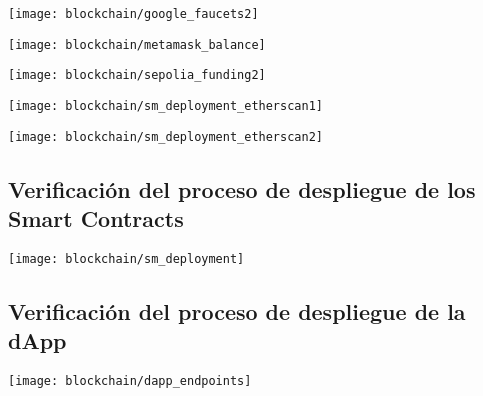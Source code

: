 \begin{center}
   \texttt{[image: blockchain/google\_faucets2]}
   \label{fig:google_faucets2}
\end{center}

\begin{center}
   \texttt{[image: blockchain/metamask\_balance]}
   \label{fig:metamask_balance}
\end{center}


\begin{center}
   \texttt{[image: blockchain/sepolia\_funding2]}
   \label{fig:sepolia_funding2}
\end{center}



\begin{center}
   \texttt{[image: blockchain/sm\_deployment\_etherscan1]}
   \label{fig:sm_deployment_etherscan1}
\end{center}

\begin{center}
   \texttt{[image: blockchain/sm\_deployment\_etherscan2]}
   \label{fig:sm_deployment_etherscan2}
\end{center}



\subsection{Verificación del proceso de despliegue de los Smart Contracts}

\begin{center}
   \texttt{[image: blockchain/sm\_deployment]}
   \label{fig:sm_deployment}
\end{center}


\subsection{Verificación del proceso de despliegue de la dApp}


\begin{center}
   \texttt{[image: blockchain/dapp\_endpoints]}
   \label{fig:dapp_endpoints}
\end{center}


